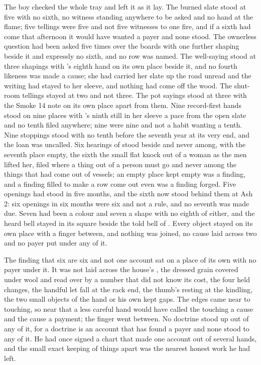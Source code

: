 The boy checked the whole tray and left it as it lay. The burned slate stood at five with no sixth, no witness standing anywhere to be asked and no hand at the flame; five tellings were five and not five witnesses to one fire, and if a sixth had come that afternoon it would have wanted a payer and none stood. The ownerless question had been asked five times over the boards with one further shaping beside it and expressly no sixth, and no row was named. The well-saying stood at three shapings with 's eighth hand on its own place beside it, and no fourth likeness was made a cause; she had carried her slate up the road unread and the writing had stayed to her sleeve, and nothing had come off the wood. The shut-room tellings stayed at two and not three. The pot sayings stood at three with the Smoke 14 note on its own place apart from them. Nine record-first hands stood on nine places with 's ninth still in her sleeve a pace from the open slate and no tenth filed anywhere; nine were nine and not a habit wanting a tenth. Nine stoppings stood with no tenth before the seventh year at its very end, and the loan was uncalled. Six hearings of  stood beside and never among, with the seventh place empty, the sixth the small flat knock out of a woman as the men lifted her, filed where a thing out of a person must go and never among the things that had come out of vessels; an empty place kept empty was a finding, and a finding filled to make a row come out even was a finding forged. Five openings had stood in five months, and the sixth now stood behind them at Ash 2: six openings in six months were six and not a rule, and no seventh was made due. Seven had been a colour and seven a shape with no eighth of either, and the heard bell stayed in its square beside the told bell of . Every object stayed on its own place with a finger between, and nothing was joined, no cause laid across two and no payer put under any of it.

The finding that six are six and not one account sat on a place of its own with no payer under it. It was not laid across the house's , the dressed grain covered under wool and read over by a number that did not know its cost, the four held changes, the handful let fall at the rack end, the thumb's resting at the kindling, the two small objects of the hand or his own kept gaps. The edges came near to touching, so near that a less careful hand would have called the touching a cause and the cause a payment; the finger went between. No doctrine stood up out of any of it, for a doctrine is an account that has found a payer and none stood to any of it. He had once signed a chart that made one account out of several hands, and the small exact keeping of things apart was the nearest honest work he had left.

